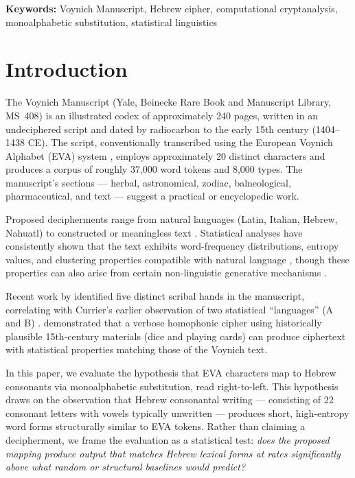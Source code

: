 \documentclass[11pt,a4paper]{article}
\begin{document}
\medskip
\noindent\textbf{Keywords:} Voynich Manuscript, Hebrew cipher, computational
cryptanalysis, monoalphabetic substitution, statistical linguistics

\section{Introduction}
\label{sec:intro}

The Voynich Manuscript (Yale, Beinecke Rare Book and Manuscript Library,
MS~408) is an illustrated codex of approximately 240 pages, written in an
undeciphered script and dated by radiocarbon to the early 15th century
(1404--1438 CE). The script, conventionally transcribed using the European
Voynich Alphabet (EVA) system \citep{Landini2001}, employs approximately
20 distinct characters and produces a corpus of roughly 37,000 word tokens
and 8,000 types. The manuscript's sections --- herbal, astronomical, zodiac,
balneological, pharmaceutical, and text --- suggest a practical or
encyclopedic work.

Proposed decipherments range from natural languages (Latin, Italian, Hebrew,
Nahuatl) to constructed or meaningless text \citep{Rugg2004}. Statistical
analyses have consistently shown that the text exhibits word-frequency
distributions, entropy values, and clustering properties compatible with
natural language \citep{Montemurro2013,Amancio2013}, though these properties
can also arise from certain non-linguistic generative mechanisms
\citep{Timm2014}.

Recent work by \citet{Davis2020} identified five distinct scribal hands in
the manuscript, correlating with Currier's earlier observation of two
statistical ``languages'' (A and B) \citep{Currier1976}. \citet{Greshko2025}
demonstrated that a verbose homophonic cipher using historically plausible
15th-century materials (dice and playing cards) can produce ciphertext with
statistical properties matching those of the Voynich text.

In this paper, we evaluate the hypothesis that EVA characters map to Hebrew
consonants via monoalphabetic substitution, read right-to-left. This
hypothesis draws on the observation that Hebrew consonantal writing ---
consisting of 22 consonant letters with vowels typically unwritten ---
produces short, high-entropy word forms structurally similar to EVA tokens.
Rather than claiming a decipherment, we frame the evaluation as a statistical
test: \emph{does the proposed mapping produce output that matches Hebrew
lexical forms at rates significantly above what random or structural baselines
would predict?}
\end{document}
